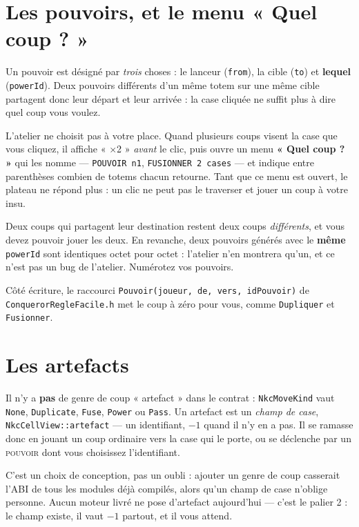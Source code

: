 \section{Les pouvoirs, et le menu « Quel coup ? »}

Un pouvoir est désigné par \emph{trois} choses : le lanceur (\texttt{from}), la
cible (\texttt{to}) et \textbf{lequel} (\texttt{powerId}). Deux pouvoirs
différents d'un même totem sur une même cible partagent donc leur départ et leur
arrivée : la case cliquée ne suffit plus à dire quel coup vous voulez.

L'atelier ne choisit pas à votre place. Quand plusieurs coups visent la case que
vous cliquez, il affiche « $\times$2 » \emph{avant} le clic, puis ouvre un menu
\textbf{« Quel coup ? »} qui les nomme --- \texttt{POUVOIR n1},
\texttt{FUSIONNER 2 cases} --- et indique entre parenthèses combien de totems
chacun retourne. Tant que ce menu est ouvert, le plateau ne répond plus : un
clic ne peut pas le traverser et jouer un coup à votre insu.

\begin{nkretenir}
Deux coups qui partagent leur destination restent deux coups \emph{différents},
et vous devez pouvoir jouer les deux. En revanche, deux pouvoirs générés avec le
\textbf{même} \texttt{powerId} sont identiques octet pour octet : l'atelier n'en
montrera qu'un, et ce n'est pas un bug de l'atelier. Numérotez vos pouvoirs.
\end{nkretenir}

Côté écriture, le raccourci \texttt{Pouvoir(joueur, de, vers, idPouvoir)} de
\texttt{ConquerorRegleFacile.h} met le coup à zéro pour vous, comme
\texttt{Dupliquer} et \texttt{Fusionner}.

\section{Les artefacts}

Il n'y a \textbf{pas} de genre de coup « artefact » dans le contrat :
\texttt{NkcMoveKind} vaut \texttt{None}, \texttt{Duplicate}, \texttt{Fuse},
\texttt{Power} ou \texttt{Pass}. Un artefact est un \emph{champ de case},
\texttt{NkcCellView::artefact} --- un identifiant, $-1$ quand il n'y en a pas.
Il se ramasse donc en jouant un coup ordinaire vers la case qui le porte, ou se
déclenche par un \textsc{pouvoir} dont vous choisissez l'identifiant.

C'est un choix de conception, pas un oubli : ajouter un genre de coup casserait
l'ABI de tous les modules déjà compilés, alors qu'un champ de case n'oblige
personne. Aucun moteur livré ne pose d'artefact aujourd'hui --- c'est le palier
2 : le champ existe, il vaut $-1$ partout, et il vous attend.


